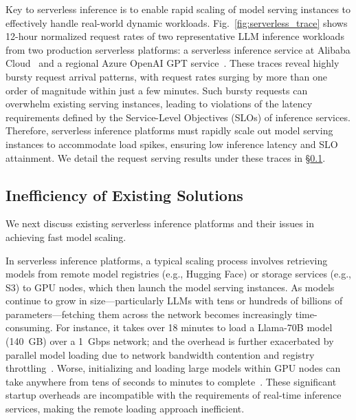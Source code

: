 Key to serverless inference is to enable rapid scaling of model serving instances to effectively handle real-world dynamic workloads.
Fig.~\ref{fig:serverless_trace} shows 12-hour normalized request rates of two representative LLM inference workloads from two production serverless platforms: a serverless inference service at Alibaba Cloud~\cite{alibaba_serverless_gpu} and a regional Azure OpenAI GPT service~\cite{burstGPT_arxiv24}.
These traces reveal highly bursty request arrival patterns, with request rates surging by more than one order of magnitude within just a few minutes. 
Such bursty requests can overwhelm existing serving instances, leading to violations of the latency requirements defined by the Service-Level Objectives (SLOs) of inference services. 
Therefore, serverless inference platforms must rapidly scale out model serving instances to accommodate load spikes, ensuring low inference latency and SLO attainment. 
We detail the request serving results under these traces in \S\ref{sec:background-limitations}.

\subsection{Inefficiency of Existing Solutions}
\label{sec:background-limitations}

We next discuss existing serverless inference platforms and their issues in achieving fast model scaling.

In serverless inference platforms, a typical scaling process involves retrieving models from remote model registries (e.g., Hugging Face) or storage services (e.g., S3) to GPU nodes, which then launch the model serving instances. 
As models continue to grow in size---particularly LLMs with tens or hundreds of billions of parameters---fetching them across the network becomes increasingly time-consuming. 
For instance, it takes over 18 minutes to load a Llama-70B model (140~GB) over a 1~Gbps network; and the overhead is further exacerbated by parallel model loading due to network bandwidth contention and registry throttling~\cite{wang_faasnet_nodate}.
Worse, initializing and loading large models within GPU nodes can take anywhere from tens of seconds to minutes to complete~\cite{faaswap,fu_serverlessllm_2024}. 
These significant startup overheads are incompatible with the requirements of real-time inference services, making the remote loading approach inefficient. 


